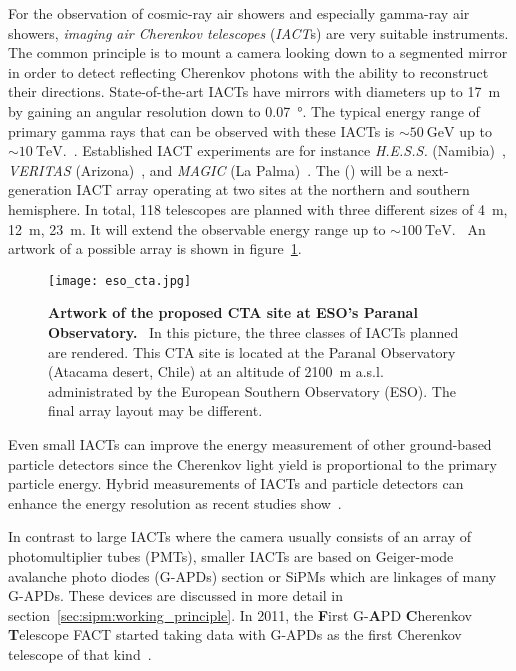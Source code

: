 For the observation of cosmic-ray air showers and especially gamma-ray air showers, \textit{imaging air Cherenkov telescopes} (\textit{IACT}s) are very suitable instruments. The common principle is to mount a camera looking down to a segmented mirror in order to detect reflecting Cherenkov photons with the ability to reconstruct their directions. State-of-the-art IACTs have mirrors with diameters up to \SI{17}{\meter} by gaining an angular resolution down to \SI{0.07}{\degree}. The typical energy range of primary gamma rays that can be observed with these IACTs is $\sim\SI{50}{\giga\electronvolt}$ up to $\sim\SI{10}{\tera\electronvolt}$.~\cite{iacts:magic}. Established IACT experiments are for instance \textit{H.E.S.S.} (Namibia)~\cite{iacts:hess}, \textit{VERITAS} (Arizona)~\cite{iacts:veritas}, and \textit{MAGIC} (La Palma)~\cite{iacts:magic}. The  () will be a next-generation IACT array operating at two sites at the northern and southern hemisphere. In total, \num{118} telescopes are planned with three different sizes of \SI{4}{\meter}, \SI{12}{\meter}, \SI{23}{\meter}. It will extend the observable energy range up to $\sim\SI{100}{\tera\electronvolt}$.~\cite{iacts:cta} An artwork of a possible array is shown in figure~\ref{cta_artwork}.

\begin{figure}[H]
	\centering
	\texttt{[image: eso\_cta.jpg]}
	\caption[Artwork of the proposed CTA site at ESO's Paranal Observatory]{\textbf{Artwork of the proposed CTA site at ESO's Paranal Observatory.}~\cite{iacts:cta_artwork} In this picture, the three classes of IACTs planned are rendered. This CTA site is located at the Paranal Observatory (Atacama desert, Chile) at an altitude of \SI{2100}{\meter} a.s.l. administrated by the European Southern Observatory (ESO). The final array layout may be different.~\cite{iacts:cta}}
	\label{cta_artwork}
\end{figure}

Even small IACTs can improve the energy measurement of other ground-based particle detectors since the Cherenkov light yield is proportional to the primary particle energy. Hybrid measurements of IACTs and particle detectors can enhance the energy resolution as recent studies show~\cite{iacts:extension}.

In contrast to large IACTs where the camera usually consists of an array of photomultiplier tubes (PMTs), smaller IACTs are based on Geiger-mode avalanche photo diodes (G-APDs) section or SiPMs which are linkages of many G-APDs. These devices are discussed in more detail in section~\ref{sec:sipm:working_principle}. In 2011, the \textbf{F}irst G-\textbf{A}PD \textbf{C}herenkov \textbf{T}elescope FACT started taking data with G-APDs as the first Cherenkov telescope of that kind~\cite{iacts:fact}.


